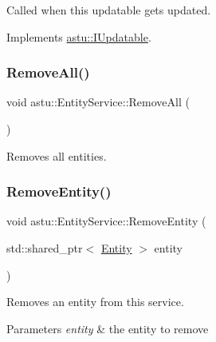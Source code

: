 Called when this updatable gets updated. 

Implements \hyperlink{classastu_1_1IUpdatable_a76c7c6e2a71b725bbdbdf6808ef4743f}{astu\+::\+I\+Updatable}.

\mbox{\label{classastu_1_1EntityService_a1b21cf207324748c13c34568d3c1513e}} 
\subsubsection{\texorpdfstring{Remove\+All()}{RemoveAll()}}
{\footnotesize\ttfamily void astu\+::\+Entity\+Service\+::\+Remove\+All (\begin{DoxyParamCaption}{ }\end{DoxyParamCaption})}

Removes all entities. \mbox{\label{classastu_1_1EntityService_a748a71e470d5bb51bb650b15e0a78c63}} 
\subsubsection{\texorpdfstring{Remove\+Entity()}{RemoveEntity()}\hspace{0.1cm}{\footnotesize\ttfamily [1/2]}}
{\footnotesize\ttfamily void astu\+::\+Entity\+Service\+::\+Remove\+Entity (\begin{DoxyParamCaption}\item[{std\+::shared\+\_\+ptr$<$ \hyperlink{classastu_1_1Entity}{Entity} $>$}]{entity }\end{DoxyParamCaption})}

Removes an entity from this service.


\begin{DoxyParams}{Parameters}
{\em entity} & the entity to remove \\
\hline
\end{DoxyParams}
\mbox{\label{classastu_1_1EntityService_a56effcd0e2c79f6b2030207541085bb5}} 
